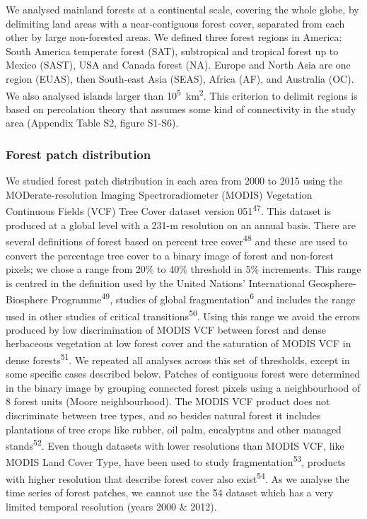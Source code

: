 \documentclass[]{article}
\begin{document}
We analysed mainland forests at a continental scale, covering the whole
globe, by delimiting land areas with a near-contiguous forest cover,
separated from each other by large non-forested areas. We defined three
forest regions in America: South America temperate forest (SAT),
subtropical and tropical forest up to Mexico (SAST), USA and Canada
forest (NA). Europe and North Asia are one region (EUAS), then
South-east Asia (SEAS), Africa (AF), and Australia (OC). We also
analysed islands larger than \si{10^5 km^2}. This criterion to delimit
regions is based on percolation theory that assumes some kind of
connectivity in the study area (Appendix Table S2, figure S1-S6).

\subsubsection{Forest patch
distribution}\label{forest-patch-distribution}

We studied forest patch distribution in each area from 2000 to 2015
using the MODerate-resolution Imaging Spectroradiometer (MODIS)
Vegetation Continuous Fields (VCF) Tree Cover dataset version
051\textsuperscript{47}. This dataset is produced at a global level with
a 231-m resolution on an annual basis. There are several definitions of
forest based on percent tree cover\textsuperscript{48} and these are
used to convert the percentage tree cover to a binary image of forest
and non-forest pixels; we chose a range from 20\% to 40\% threshold in
5\% increments. This range is centred in the definition used by the
United Nations' International Geosphere-Biosphere
Programme\textsuperscript{49}, studies of global
fragmentation\textsuperscript{6} and includes the range used in other
studies of critical transitions\textsuperscript{50}. Using this range we
avoid the errors produced by low discrimination of MODIS VCF between
forest and dense herbaceous vegetation at low forest cover and the
saturation of MODIS VCF in dense forests\textsuperscript{51}. We
repeated all analyses across this set of thresholds, except in some
specific cases described below. Patches of contiguous forest were
determined in the binary image by grouping connected forest pixels using
a neighbourhood of 8 forest units (Moore neighbourhood). The MODIS VCF
product does not discriminate between tree types, and so besides natural
forest it includes plantations of tree crops like rubber, oil palm,
eucalyptus and other managed stands\textsuperscript{52}. Even though
datasets with lower resolutions than MODIS VCF, like MODIS Land Cover
Type, have been used to study fragmentation\textsuperscript{53},
products with higher resolution that describe forest cover also
exist\textsuperscript{54}. As we analyse the time series of forest
patches, we cannot use the 54 dataset which has a very limited temporal
resolution (years 2000 \& 2012).
\end{document}
